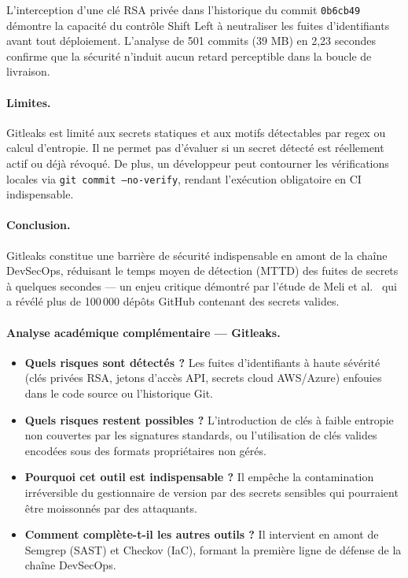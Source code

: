 \begin{tcolorbox}[colback=LightGray!30, colframe=clrBlue, arc=3pt, title={\small\bfseries Synthèse d'analyse critique — Gitleaks}]
L'interception d'une clé RSA privée dans l'historique du commit \texttt{0b6cb49} démontre la capacité du contrôle Shift Left à neutraliser les fuites d'identifiants avant tout déploiement. L'analyse de 501 commits (39 MB) en 2,23 secondes confirme que la sécurité n'induit aucun retard perceptible dans la boucle de livraison.
\end{tcolorbox}

\paragraph{Limites.}
Gitleaks est limité aux secrets statiques et aux motifs détectables par regex ou calcul d'entropie. Il ne permet pas d'évaluer si un secret détecté est réellement actif ou déjà révoqué. De plus, un développeur peut contourner les vérifications locales via \texttt{git commit --no-verify}, rendant l'exécution obligatoire en CI indispensable.

\paragraph{Conclusion.}
Gitleaks constitue une barrière de sécurité indispensable en amont de la chaîne DevSecOps, réduisant le temps moyen de détection (MTTD) des fuites de secrets à quelques secondes — un enjeu critique démontré par l'étude de Meli et al.~\cite{meli_secret_leaks_2019} qui a révélé plus de 100\,000 dépôts GitHub contenant des secrets valides.

\paragraph{Analyse académique complémentaire — Gitleaks.}
\begin{itemize}
    \item \textbf{Quels risques sont détectés ?} Les fuites d'identifiants à haute sévérité (clés privées RSA, jetons d'accès API, secrets cloud AWS/Azure) enfouies dans le code source ou l'historique Git.
    \item \textbf{Quels risques restent possibles ?} L'introduction de clés à faible entropie non couvertes par les signatures standards, ou l'utilisation de clés valides encodées sous des formats propriétaires non gérés.
    \item \textbf{Pourquoi cet outil est indispensable ?} Il empêche la contamination irréversible du gestionnaire de version par des secrets sensibles qui pourraient être moissonnés par des attaquants.
    \item \textbf{Comment complète-t-il les autres outils ?} Il intervient en amont de Semgrep (SAST) et Checkov (IaC), formant la première ligne de défense de la chaîne DevSecOps.
\end{itemize}

